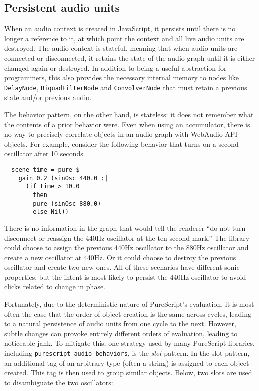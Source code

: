 \documentclass{sig-alternate}
\begin{document}
\begin{sloppypar}
  \subsection{Persistent audio units}

  When an audio context is created in JavaScript, it persists until there is no longer a reference to it, at which point the context and all live audio units are destroyed.  The audio context is stateful, meaning that when audio units are connected or disconnected, it retains the state of the audio graph until it is either changed again or destroyed.  In addition to being a useful abstraction for programmers, this also provides the necessary internal memory to nodes like \verb=DelayNode=, \verb=BiquadFilterNode= and \verb=ConvolverNode= that must retain a previous state and/or previous audio.

  The behavior pattern, on the other hand, is stateless: it does not remember what the contents of a prior behavior were.  Even when using an accumulator, there is no way to precisely correlate objects in an audio graph with WebAudio API objects.  For example, consider the following behavior that turns on a second oscillator after 10 seconds.

  \begin{verbatim}
  scene time = pure $
    gain 0.2 (sinOsc 440.0 :|
      (if time > 10.0
        then
        pure (sinOsc 880.0)
        else Nil))
  \end{verbatim}

  There is no information in the graph that would tell the renderer ``do not turn disconnect or reassign the 440Hz oscillator at the ten-second mark.''  The library could choose to assign the previous 440Hz oscillator to the 880Hz oscillator and create a new oscillator at 440Hz.  Or it could choose to destroy the previous oscillator and create two new ones.  All of these scenarios have different sonic properties, but the intent is most likely to persist the 440Hz oscillator to avoid clicks related to change in phase.

  Fortunately, due to the deterministic nature of PureScript's evaluation, it is most often the case that the order of object creation is the same across cycles, leading to a natural persistence of audio units from one cycle to the next.  However, subtle changes can provoke entirely different orders of evaluation, leading to noticeable jank. To mitigate this, one strategy used by many PureScript libraries, including \texttt{purescript-audio-behaviors}, is the \textit{slot} pattern. In the slot pattern, an additional tag of an arbitrary type (often a string) is assigned to each object created.  This tag is then used to group similar objects.  Below, two slots are used to disambiguate the two oscillators:


\end{sloppypar}
\end{document}
